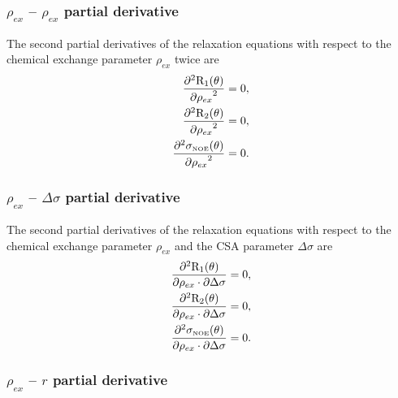 \subsubsection{$\rho_{ex}$ -- $\rho_{ex}$ partial derivative}

The second partial derivatives of the relaxation equations with respect to the chemical exchange parameter $\rho_{ex}$ twice are
\begin{subequations}
\begin{align}
    \frac{\partial^2 \mathrm{R}_1(\theta)}{{\partial \rho_{ex}}^2} &= 0,        \label{eq: Ri': d2R1/dRex2} \\
    \frac{\partial^2 \mathrm{R}_2(\theta)}{{\partial \rho_{ex}}^2} &= 0,        \label{eq: Ri': d2R2/dRex2} \\
    \frac{\partial^2 \sigma_{\scriptscriptstyle \mathrm{NOE}}(\theta)}{{\partial \rho_{ex}}^2} &= 0. \label{eq: Ri': d2sigmaNOE/dRex2}
\end{align}
\end{subequations}


\subsubsection{$\rho_{ex}$ -- $\Delta\sigma$ partial derivative}

The second partial derivatives of the relaxation equations with respect to the chemical exchange parameter $\rho_{ex}$ and the CSA parameter $\Delta\sigma$ are
\begin{subequations}
\begin{align}
    \frac{\partial^2 \mathrm{R}_1(\theta)}{\partial \rho_{ex} \cdot \partial \Delta\sigma} &= 0,        \label{eq: Ri': d2R1/dRex.dCSA} \\
    \frac{\partial^2 \mathrm{R}_2(\theta)}{\partial \rho_{ex} \cdot \partial \Delta\sigma} &= 0,        \label{eq: Ri': d2R2/dRex.dCSA} \\
    \frac{\partial^2 \sigma_{\scriptscriptstyle \mathrm{NOE}}(\theta)}{\partial \rho_{ex} \cdot \partial \Delta\sigma} &= 0. \label{eq: Ri': d2sigmaNOE/dRex.dCSA}
\end{align}
\end{subequations}


\subsubsection{$\rho_{ex}$ -- $r$ partial derivative}

